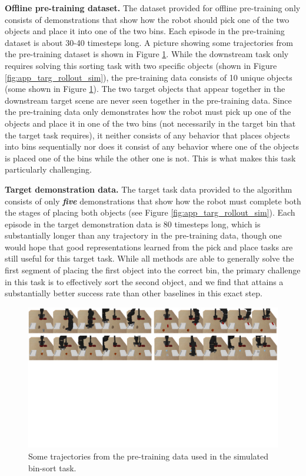 \documentclass[conference]{IEEEtran}
\begin{document}
\textbf{Offline pre-training dataset.} The dataset provided for offline pre-training only consists of demonstrations that show how the robot should pick one of the two objects and place it into one of the two bins. Each episode in the pre-training dataset is about 30-40 timesteps long. A picture showing some trajectories from the pre-training dataset is shown in Figure \ref{fig:app_pretrain_rollout_sim}. While the downstream task only requires solving this sorting task with two specific objects (shown in Figure \ref{fig:app_targ_rollout_sim}), the pre-training data consists of 10 unique objects (some shown in Figure \ref{fig:app_pretrain_rollout_sim}). The two target objects that appear together in the downstream target scene are never seen together in the pre-training data. Since the pre-training data only demonstrates how the robot must pick up one of the objects and place it in one of the two bins (not necessarily in the target bin that the target task requires), it neither consists of any behavior that places objects into bins sequentially nor does it consist of any behavior where one of the objects is placed one of the bins while the other one is not. This is what makes this  task particularly challenging.

\textbf{Target demonstration data.} The target task data provided to the algorithm consists of only \textbf{\emph{five}} demonstrations that show how the robot must complete both the stages of placing both objects (see Figure \ref{fig:app_targ_rollout_sim}). Each episode in the target demonstration data is 80 timesteps long, which is substantially longer than any trajectory in the pre-training data, though one would hope that good representations learned from the pick and place tasks are still useful for this target task. While all methods are able to generally solve the first segment of placing the first object into the correct bin, the primary challenge in this task is to effectively sort the second object, and we find that \methodname attains a substantially better success rate than other baselines in this exact step.  

\begin{figure}
\centering
  \includegraphics[width=\textwidth]{BinsortPretrainTrajAppendix.pdf}
  \caption{\label{fig:app_pretrain_rollout_sim} \footnotesize {Some trajectories from the pre-training data used in the simulated bin-sort task.}}
\end{figure}
\end{document}
